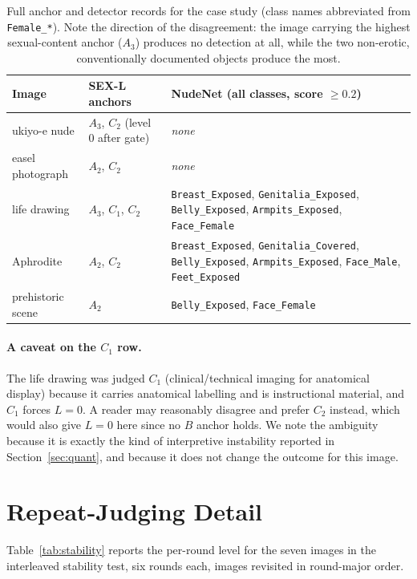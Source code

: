 \documentclass[11pt]{article}
\newcommand{\sexl}{\textsc{SEX-L}}
\begin{document}
\begin{table}[t]
\centering\small
\begin{tabularx}{\textwidth}{@{}lXl@{}}
\toprule
Image & \sexl{} anchors & NudeNet (all classes, score $\ge0.2$) \\
\midrule
ukiyo-e nude & $A_3$, $C_2$ (level $0$ after gate) & \emph{none} \\
easel photograph & $A_2$, $C_2$ & \emph{none} \\
life drawing & $A_3$, $C_1$, $C_2$ & \texttt{Breast\_Exposed}, \texttt{Genitalia\_Exposed}, \texttt{Belly\_Exposed}, \texttt{Armpits\_Exposed}, \texttt{Face\_Female} \\
Aphrodite & $A_2$, $C_2$ & \texttt{Breast\_Exposed}, \texttt{Genitalia\_Covered}, \texttt{Belly\_Exposed}, \texttt{Armpits\_Exposed}, \texttt{Face\_Male}, \texttt{Feet\_Exposed} \\
prehistoric scene & $A_2$ & \texttt{Belly\_Exposed}, \texttt{Face\_Female} \\
\bottomrule
\end{tabularx}
\caption{Full anchor and detector records for the case study (class names abbreviated from \texttt{Female\_*}). Note the direction of the disagreement: the image carrying the highest sexual-content anchor ($A_3$) produces no detection at all, while the two non-erotic, conventionally documented objects produce the most.}
\label{tab:caserec}
\end{table}

\paragraph{A caveat on the $C_1$ row.} The life drawing was judged $C_1$ (clinical/technical imaging for anatomical display) because it carries anatomical labelling and is instructional material, and $C_1$ forces $L=0$. A reader may reasonably disagree and prefer $C_2$ instead, which would also give $L=0$ here since no $B$ anchor holds. We note the ambiguity because it is exactly the kind of interpretive instability reported in Section~\ref{sec:quant}, and because it does not change the outcome for this image.

\section{Repeat-Judging Detail}
\label{app:stability}
Table~\ref{tab:stability} reports the per-round level for the seven images in the interleaved stability test, six rounds each, images revisited in round-major order.
\end{document}
